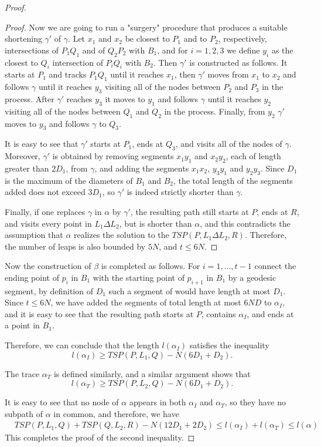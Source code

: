 \begin{proof}
\begin{proof}
Now we are going to run a "surgery" procedure that produces a suitable shortening $\gamma'$ of $\gamma$.
Let $x_1$ and $x_2$ be closest to $P_1$ and to $P_2$, respectively, intersections of $P_1Q_1$ and of $Q_2P_2$ with $B_1$, and for $i=1,2,3$ we define $y_i$ as the closest to $Q_i$ intersection of $P_iQ_i$ with $B_2$. Then $\gamma'$ is constructed as follows. It starts at $P_1$ and tracks $P_1Q_1$ until it reaches $x_1$, then $\gamma'$ moves from $x_1$ to $x_2$ and follows $\gamma$ until it reaches $y_3$ visiting all of the nodes between $P_2$ and $P_3$ in the process. After $\gamma'$ reaches $y_3$ it moves to $y_1$ and follows $\gamma$ until it reaches $y_2$ visiting all of the nodes between $Q_1$ and $Q_2$ in the process. Finally, from $y_2$ $\gamma'$ moves to $y_3$ and follows $\gamma$ to $Q_3$.

It is easy to see that $\gamma'$ starts at $P_1$, ends at $Q_3$, and visits all of the nodes of $\gamma$.  Moreover, $\gamma'$ is obtained by removing segments $x_1y_1$ and $x_2y_2$, each of length greater than $2D_1$, from $\gamma$, and adding the segments $x_1x_2$, $y_3y_1$ and $y_2y_3$. Since $D_1$ is the maximum of the diameters of $B_1$ and $B_2$, the total length of the segments added does not exceed $3D_1$, so $\gamma'$ is indeed strictly shorter than $\gamma$.

Finally, if one replaces $\gamma$ in $\alpha$ by $\gamma'$, the resulting path still starts at $P$, ends at $R$, and visits every point in $L_1 \Delta L_2$, but is shorter than $\alpha$, and this contradicts the assumption that $\alpha$ realizes the solution to the $TSP(P, L_1 \Delta L_2, R)$.
Therefore, the number of leaps is also bounded by $5N$, and  $t \leq 6N$.
\end{proof}
Now the construction of $\beta$ is completed as follows. For $i=1,\ldots,t-1$ connect the ending point of $p_i$ in $B_1$ with the starting point of $p_{i+1}$ in $B_1$ by a geodesic segment, by definition of $D_1$ such a segment of would have length at most $D_1$. Since $t \leq 6N$, we have added the segments of total length at most $6ND$ to $\alpha_I$, and it is easy to see that the resulting path starts at $P$, contains $\alpha_I$, and ends at a point in $B_1$.

Therefore, we can conclude that the length $l(\alpha_I)$ satisfies the inequality $$ l(\alpha_I) \geq TSP(P, L_1, Q) -N(6D_1+D_2).$$

The trace $\alpha_T$ is defined similarly, and a similar argument shows that $$ l(\alpha_T) \geq TSP(P, L_2, Q) -N(6D_1+D_2).$$

It is easy to see that no node of $\alpha$ appears in  both $\alpha_I$ and $\alpha_T$, so they have no subpath of $\alpha$ in common, and therefore, we have 
\begin{align*}
   &TSP(P, L_1, Q)+TSP(Q, L_2, R)-N(12D_1+2D_2) \leq l(\alpha_I)+l(\alpha_T)  \leq l(\alpha)
\end{align*}
 This completes the proof of the second inequality.


 
\end{proof}
